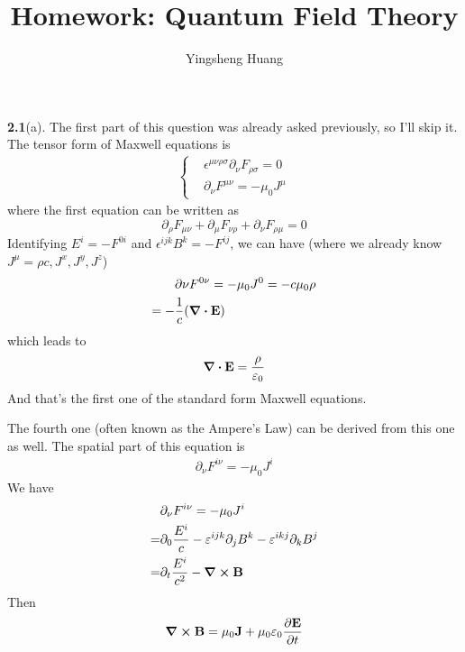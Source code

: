 \documentclass{article}
\title{Homework: Quantum Field Theory}
\author{Yingsheng Huang}
\begin{document}
\maketitle



{\bf2.1}\quad(a). The first part of this question was already asked previously, so I'll skip it. The tensor form of Maxwell equations is
\begin{align}
 \begin{cases}
   &\epsilon^{\mu\nu\rho\sigma}\partial_{\nu}F_{\rho\sigma}=0\\
   &\partial_{\nu}F^{\mu\nu}=-\mu_0J^{\mu}
 \end{cases}
\end{align}
where the first equation can be written as
\begin{equation*}
  \partial_{\rho}F_{\mu\nu}+\partial_{\mu}F_{\nu\rho}+\partial_{\nu}F_{\rho\mu}=0
\end{equation*}
Identifying $E^i=-F^{0i}$ and $\epsilon^{ijk}B^k=-F^{ij}$, we can have (where we already know $J^{\mu}={\rho c,J^x,J^y,J^z}$)
\begin{align*}
&\partial{\nu}F^{0\nu}=-\mu_0J^0=-c\mu_0\rho\\
=-&\frac{1}{c}(\div{\vb{E}})
\end{align*}
which leads to
\begin{align}
\div{\vb{E}}=\frac{\rho}{\varepsilon_0}
\end{align}
And that's the first one of the standard form Maxwell equations.

The fourth one (often known as the Ampere's Law) can be derived from this one as well. The spatial part of this equation is
\begin{align*}
\partial_{\nu}F^{i\nu}=-\mu_0J^i
\end{align*}
We have
\begin{align*}
  &\partial_{\nu}F^{i\nu}=-\mu_0J^i\\
  =&\partial_0\frac{E^i}{c}-\varepsilon^{ijk}\partial_jB^k-\varepsilon^{ikj}\partial_kB^j\\
  =&\partial_t\frac{E^i}{c^2}-\curl{\vb{B}}
\end{align*}
Then
\begin{align}
 \curl{\vb{B}}=\mu_0\vb{J}+\mu_0\varepsilon_0\pdv{\vb{E}}{t}
\end{align}
\end{document}
